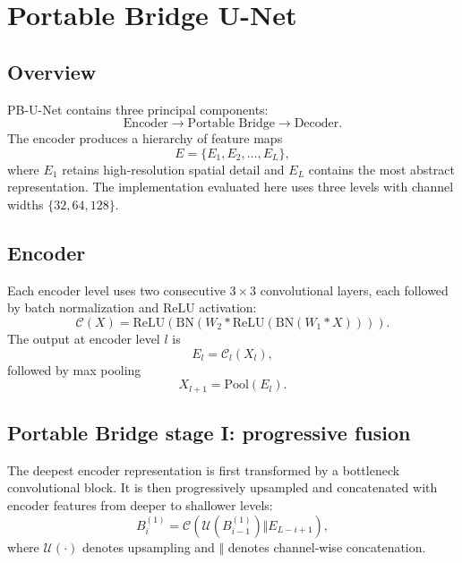 \documentclass[11pt]{article}
\begin{document}
\section{Portable Bridge U-Net}
\subsection{Overview}
PB-U-Net contains three principal components:
\begin{equation}
\text{Encoder} \rightarrow \text{Portable Bridge} \rightarrow \text{Decoder}.
\end{equation}
The encoder produces a hierarchy of feature maps
\begin{equation}
E = \{E_1,E_2,\ldots,E_L\},
\end{equation}
where $E_1$ retains high-resolution spatial detail and $E_L$ contains the most abstract representation. The implementation evaluated here uses three levels with channel widths $\{32,64,128\}$.

\subsection{Encoder}
Each encoder level uses two consecutive $3\times3$ convolutional layers, each followed by batch normalization and ReLU activation:
\begin{equation}
\mathcal{C}(X)=\mathrm{ReLU}\left(\mathrm{BN}\left(W_2 * \mathrm{ReLU}(\mathrm{BN}(W_1 * X))\right)\right).
\end{equation}
The output at encoder level $l$ is
\begin{equation}
E_l = \mathcal{C}_l(X_l),
\end{equation}
followed by max pooling
\begin{equation}
X_{l+1}=\mathrm{Pool}(E_l).
\end{equation}

\subsection{Portable Bridge stage I: progressive fusion}
The deepest encoder representation is first transformed by a bottleneck convolutional block. It is then progressively upsampled and concatenated with encoder features from deeper to shallower levels:
\begin{equation}
B_i^{(1)}=\mathcal{C}\left(\mathcal{U}(B_{i-1}^{(1)})\Vert E_{L-i+1}\right),
\end{equation}
where $\mathcal{U}(\cdot)$ denotes upsampling and $\Vert$ denotes channel-wise concatenation.
\end{document}
